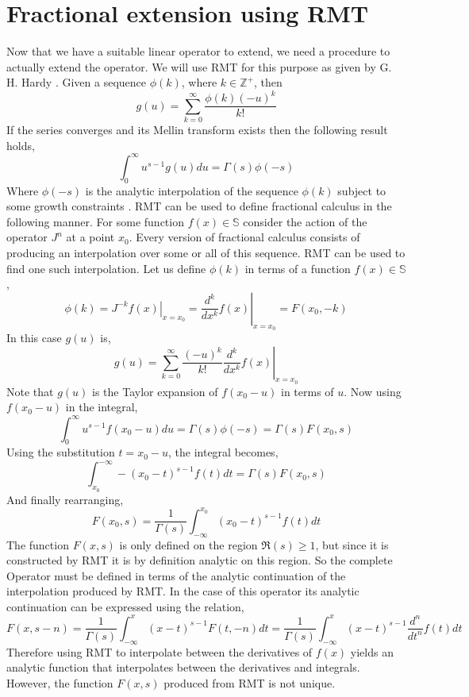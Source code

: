 \documentclass[%
 onecolumn,
 amsmath, amssymb, aps, pra, 10pt
]{revtex4-2}
\begin{document}
\section{Fractional extension using RMT}
Now that we have a suitable linear operator to extend, we need a procedure to actually extend the operator. We will use RMT for this purpose as given by G. H. Hardy \cite[p.~186]{hardy1940ramanujan}. Given a sequence $\phi(k)$, where $k \in \mathbb{Z}^+$, then
\[g(u) = \sum_{k=0}^\infty \frac{\phi(k)(-u)^k}{k!}\]
If the series converges and its Mellin transform exists then the following result holds,
\[\int_0^{\infty} u^{s-1}g(u)du = \Gamma(s)\phi(-s)\]
Where $\phi(-s)$ is the analytic interpolation of the sequence $\phi(k)$ subject to some growth constraints \cite[p.~188--189]{hardy1940ramanujan}.
RMT can be used to define fractional calculus in the following manner. For some function $f(x) \in \mathbb{S}$ consider the action of the operator $J^n$ at a point $x_0$. Every version of fractional calculus consists of producing an interpolation over some or all of this sequence. RMT can be used to find one such interpolation. Let us define $\phi(k)$ in terms of a function $f(x) \in \mathbb{S}$ ,
\[\phi(k) = \left. J^{-k}f(x)\right|_{x = x_0} = \left. \frac{d^k}{dx^k}f(x) \right|_{x = x_0} = F(x_0, -k)\]
In this case $g(u)$ is,
\[g(u) = \sum_{k=0}^\infty \frac{(-u)^k}{k!} \left. \frac{d^k}{dx^k}f(x)\right|_{x=x_0}\]
Note that $g(u)$ is the Taylor expansion of $f(x_0 - u)$ in terms of $u$. Now using $f(x_0 - u)$ in the integral,
\[\int_0^{\infty} u^{s-1}f(x_0 - u)du = \Gamma(s)\phi(-s) = \Gamma(s)F(x_0, s)\]
Using the substitution $t = x_0 - u$, the integral becomes,
\[\int_{x_0}^{-\infty} -(x_0 - t)^{s-1}f(t)dt = \Gamma(s)F(x_0, s)\]
And finally rearranging,
\[F(x_0, s) = \frac{1}{\Gamma(s)} \int_{-\infty}^{x_0} (x_0 - t)^{s-1} f(t)dt\]
The function $F(x, s)$ is only defined on the region $\mathfrak{R}(s) \geq 1$, but since it is constructed by RMT it is by definition analytic on this region. So the complete Operator must be defined in terms of the analytic continuation of the interpolation produced by RMT. In the case of this operator its analytic continuation can be expressed using the relation, 
\begin{equation}
F(x, s-n) = \frac{1}{\Gamma(s)} \int_{-\infty}^{x} (x - t)^{s-1} F(t, -n)dt = \frac{1}{\Gamma(s)} \int_{-\infty}^{x} (x - t)^{s-1} \frac{d^n}{dt^n}f(t)dt
\label{analytic_continuation}
\end{equation}
Therefore using RMT to interpolate between the derivatives of $f(x)$ yields an analytic function that interpolates between the derivatives and integrals. However, the function $F(x, s)$ produced from RMT is not unique.
\end{document}
